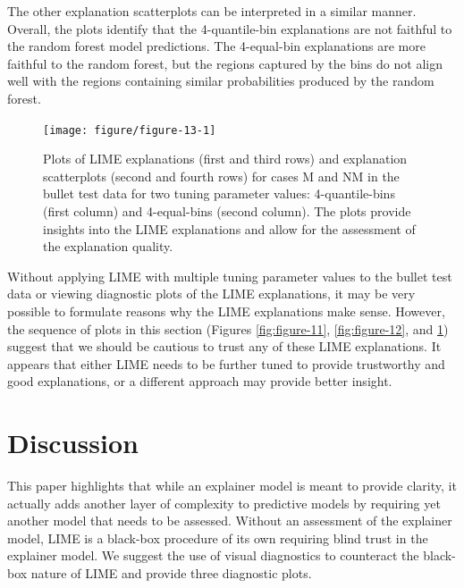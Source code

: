 \documentclass[AMS,STIX2COL]{WileyNJD-v2}\usepackage[]{graphicx}\usepackage[]{color}
\newenvironment{knitrout}{}{} %
\begin{document}
The other explanation scatterplots can be interpreted in a similar manner. Overall, the plots identify that the 4-quantile-bin explanations are not faithful to the random forest model predictions. The 4-equal-bin explanations are more faithful to the random forest, but the regions captured by the bins do not align well with the regions containing  similar probabilities produced by the random forest.

\begin{figure}[!thp]
\begin{knitrout}
\color{fgcolor}

{\centering \texttt{[image: figure/figure-13-1]} 

}



\end{knitrout}
\caption{Plots of LIME explanations (first and third rows) and explanation scatterplots (second and fourth rows) for  cases M and NM in the bullet test data for two tuning parameter values: 4-quantile-bins (first column) and 4-equal-bins (second column).  The plots provide insights into the LIME explanations and allow for the assessment of the explanation quality.}
\label{fig:figure-13}
\end{figure}

Without applying LIME with multiple tuning parameter values to the bullet test data or viewing diagnostic plots of the LIME explanations, it may be very possible to formulate reasons why the LIME explanations make sense. However, the sequence of plots in this section (Figures \ref{fig:figure-11}, \ref{fig:figure-12}, and \ref{fig:figure-13}) suggest that we should be cautious to trust any of these LIME explanations. It appears that either LIME needs to be further tuned to provide trustworthy and good explanations, or a different approach may provide better insight. 

\section{Discussion} \label{discussion}

This paper highlights that while an explainer model is meant to provide clarity, it actually adds another layer of complexity to predictive models by requiring yet another model that needs to be assessed. Without an assessment of the explainer model, LIME is a black-box procedure of its own requiring blind trust in the explainer model. We suggest the use of visual diagnostics to counteract the black-box nature of LIME and provide three diagnostic plots.
\end{document}
